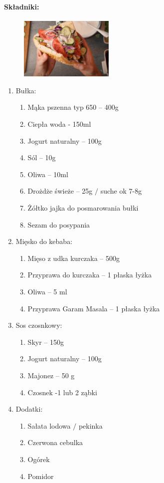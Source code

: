 \documentclass{article}
\begin{document}
    \paragraph{Składniki:}
    \begin{figure}
        \includegraphics[width=0.4\textwidth]{kebab.jpg}
    \end{figure}
    \begin{enumerate}
        \item Bułka:
        \begin{enumerate}
            \item Mąka pszenna typ 650 – 400g
            \item Ciepła woda - 150ml
            \item Jogurt naturalny – 100g
            \item Sól – 10g
            \item Oliwa – 10ml
            \item Drożdże świeże – 25g $/$ suche ok 7-8g
            \item Żółtko jajka do posmarowania bułki
            \item Sezam do posypania
        \end{enumerate}
        \item Mięsko do kebaba:
        \begin{enumerate}
            \item Mięso z udka kurczaka – 500g
            \item Przyprawa do kurczaka –  1 płaska łyżka
            \item Oliwa – 5 ml
            \item Przyprawa Garam Masala – 1 płaska łyżka
        \end{enumerate}
        \item Sos czosnkowy:
        \begin{enumerate}
            \item Skyr – 150g
            \item Jogurt naturalny – 100g
            \item Majonez – 50 g
            \item Czosnek -1 lub 2 ząbki
        \end{enumerate}
        \item Dodatki:
        \begin{enumerate}
            \item Sałata lodowa $/$ pekinka
            \item Czerwona cebulka
            \item Ogórek
            \item Pomidor
        \end{enumerate}
    \end{enumerate}
\end{document}
